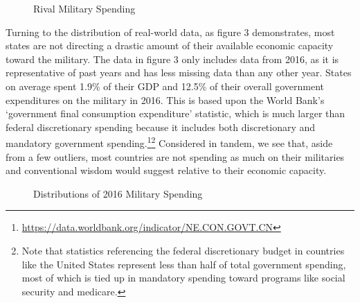 \documentclass[12pt]{article}
\begin{document}
\begin{figure}[!h]
    \begin{center}
        \resizebox{0.95\linewidth}{!}{%
            
        }
        \caption{Rival Military Spending}
    \end{center}
\end{figure}


Turning to the distribution of real-world data, as figure 3 demonstrates, most states are not directing a drastic amount of their available economic capacity toward the military. The data in figure 3 only includes data from 2016, as it is representative of past years and has less missing data than any other year. States on average spent 1.9\% of their GDP and 12.5\% of their overall government expenditures on the military in 2016. This is based upon the World Bank's `government final consumption expenditure' statistic, which is much larger than federal discretionary spending because it includes both discretionary and mandatory government spending.\footnote{\url{https://data.worldbank.org/indicator/NE.CON.GOVT.CN}}\footnote{Note that statistics referencing the federal discretionary budget in countries like the United States represent less than half of total government spending, most of which is tied up in mandatory spending toward programs like social security and medicare.} Considered in tandem, we see that, aside from a few outliers, most countries are not spending as much on their militaries and conventional wisdom would suggest relative to their economic capacity.


\begin{figure}[!h]
    \begin{center}
        \caption{Distributions of 2016 Military Spending}
    \end{center}
\end{figure}
\end{document}
